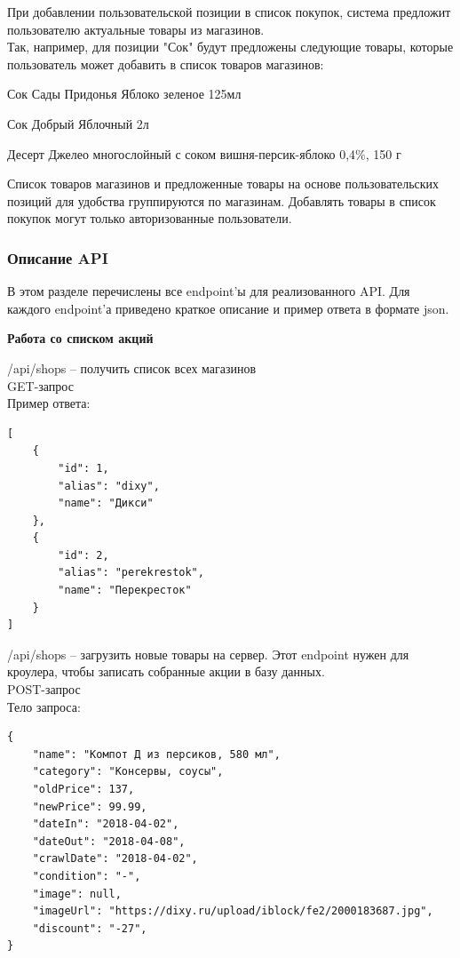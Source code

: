 При добавлении пользовательской позиции в список покупок, система предложит
пользователю актуальные товары из магазинов.\\
Так, например, для позиции "Сок" будут предложены следующие товары, 
которые пользователь может добавить в список товаров магазинов:
\begin{my_enumerate}
\item Сок Сады Придонья Яблоко зеленое 125мл
\item Сок Добрый Яблочный 2л
\item Десерт Джелео многослойный с соком вишня-персик-яблоко 0,4\%, 150 г
\end{my_enumerate}

Список товаров магазинов и предложенные товары на основе пользовательских
позиций для удобства группируются по магазинам.
Добавлять товары в список покупок могут только авторизованные пользователи.


\subsubsection{Описание API}
В этом разделе перечислены все endpoint'ы для реализованного API.
Для каждого endpoint'а приведено краткое описание и пример ответа в формате
json.

\textbf{Работа со списком акций}

\noindent
/api/shops -- получить список всех магазинов\\
GET-запрос\\
Пример ответа:
\begin{verbatim}
[
    {
        "id": 1,
        "alias": "dixy",
        "name": "Дикси"
    },
    {
        "id": 2,
        "alias": "perekrestok",
        "name": "Перекресток"
    }
]
\end{verbatim}

\noindent
/api/shops -- загрузить новые товары на сервер. Этот endpoint нужен для
кроулера, чтобы записать собранные акции в базу данных. \\
POST-запрос\\
Тело запроса:
\begin{verbatim}
{
    "name": "Компот Д из персиков, 580 мл",
    "category": "Консервы, соусы",
    "oldPrice": 137,
    "newPrice": 99.99,
    "dateIn": "2018-04-02",
    "dateOut": "2018-04-08",
    "crawlDate": "2018-04-02",
    "condition": "-",
    "image": null,
    "imageUrl": "https://dixy.ru/upload/iblock/fe2/2000183687.jpg",
    "discount": "-27",
}
\end{verbatim}


